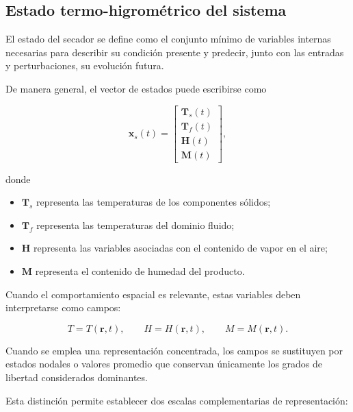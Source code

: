 \subsection{Estado termo-higrométrico del sistema}
\label{subsec:estado_termohigrometrico}

El estado del secador se define como el conjunto mínimo de variables internas necesarias para describir su condición presente y predecir, junto con las entradas y perturbaciones, su evolución futura.

De manera general, el vector de estados puede escribirse como

\begin{equation}
\mathbf{x}_s(t)
=
\begin{bmatrix}
\mathbf{T}_s(t)\\
\mathbf{T}_f(t)\\
\mathbf{H}(t)\\
\mathbf{M}(t)
\end{bmatrix},
\label{eq:estado_secador}
\end{equation}

donde

\begin{itemize}
    \item $\mathbf{T}_s$ representa las temperaturas de los componentes sólidos;
    \item $\mathbf{T}_f$ representa las temperaturas del dominio fluido;
    \item $\mathbf{H}$ representa las variables asociadas con el contenido de vapor en el aire;
    \item $\mathbf{M}$ representa el contenido de humedad del producto.
\end{itemize}

Cuando el comportamiento espacial es relevante, estas variables deben interpretarse como campos:

\begin{equation}
T=T(\mathbf{r},t),
\qquad
H=H(\mathbf{r},t),
\qquad
M=M(\mathbf{r},t).
\end{equation}

Cuando se emplea una representación concentrada, los campos se sustituyen por estados nodales o valores promedio que conservan únicamente los grados de libertad considerados dominantes.

Esta distinción permite establecer dos escalas complementarias de representación:

